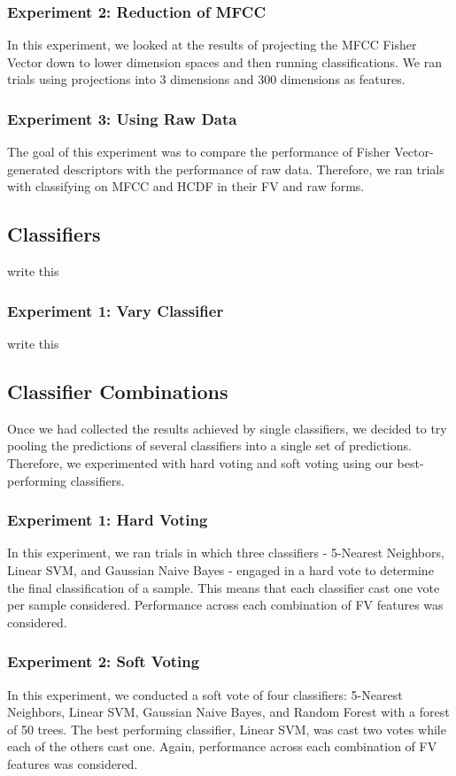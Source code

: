 \subsubsection{Experiment 2: Reduction of MFCC}
In this experiment, we looked at the results of projecting the MFCC Fisher Vector down to lower dimension spaces and then running classifications. We ran trials using projections into 3 dimensions and 300 dimensions as features.

\subsubsection{Experiment 3: Using Raw Data}
The goal of this experiment was to compare the performance of Fisher Vector-generated descriptors with the performance of raw data.  Therefore, we ran trials with classifying on MFCC and HCDF in their FV and raw forms. 

\subsection{Classifiers}
write this
\subsubsection{Experiment 1: Vary Classifier}
write this

\subsection{Classifier Combinations}
Once we had collected the results achieved by single classifiers, we decided to try pooling the predictions of several classifiers into a single set of predictions. Therefore, we experimented with hard voting and soft voting using our best-performing classifiers.

\subsubsection{Experiment 1: Hard Voting}
In this experiment, we ran trials in which three classifiers - 5-Nearest Neighbors, Linear SVM, and Gaussian Naive Bayes - engaged in a hard vote to determine the final classification of a sample. This means that each classifier cast one vote per sample considered. Performance across each combination of FV features was considered.

\subsubsection{Experiment 2: Soft Voting} In this experiment, we conducted a soft vote of four classifiers: 5-Nearest Neighbors, Linear SVM, Gaussian Naive Bayes, and Random Forest with a forest of 50 trees. The best performing classifier, Linear SVM, was cast two votes while each of the others cast one. Again, performance across each combination of FV features was considered.








